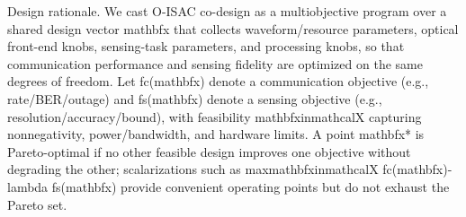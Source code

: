 {}\markdownRendererThematicBreak{}\markdownRendererInterblockSeparator
{}
\markdownRendererSectionEnd 
\markdownRendererSectionEnd \markdownRendererSectionBegin
{}\markdownRendererInterblockSeparator
{}\markdownRendererSectionBegin
{}\markdownRendererInterblockSeparator
{}Design rationale. We cast O-ISAC co-design as a multiobjective program over a shared design vector \markdownRendererDollarSign{}\markdownRendererBackslash{}mathbf\markdownRendererLeftBrace{}x\markdownRendererRightBrace{}\markdownRendererDollarSign{} that collects waveform/resource parameters, optical front-end knobs, sensing-task parameters, and processing knobs, so that communication performance and sensing fidelity are optimized on the same degrees of freedom. Let \markdownRendererDollarSign{}f\markdownRendererUnderscore{}c(\markdownRendererBackslash{}mathbf\markdownRendererLeftBrace{}x\markdownRendererRightBrace{})\markdownRendererDollarSign{} denote a communication objective (e.g., rate/BER/outage) and \markdownRendererDollarSign{}f\markdownRendererUnderscore{}s(\markdownRendererBackslash{}mathbf\markdownRendererLeftBrace{}x\markdownRendererRightBrace{})\markdownRendererDollarSign{} denote a sensing objective (e.g., resolution/accuracy/bound), with feasibility \markdownRendererDollarSign{}\markdownRendererBackslash{}mathbf\markdownRendererLeftBrace{}x\markdownRendererRightBrace{}\markdownRendererBackslash{}in\markdownRendererBackslash{}mathcal\markdownRendererLeftBrace{}X\markdownRendererRightBrace{}\markdownRendererDollarSign{} capturing nonnegativity, power/bandwidth, and hardware limits. A point \markdownRendererDollarSign{}\markdownRendererBackslash{}mathbf\markdownRendererLeftBrace{}x\markdownRendererRightBrace{}\markdownRendererCircumflex{}*\markdownRendererDollarSign{} is Pareto-optimal if no other feasible design improves one objective without degrading the other; scalarizations such as \markdownRendererDollarSign{}\markdownRendererBackslash{}max\markdownRendererUnderscore{}\markdownRendererLeftBrace{}\markdownRendererBackslash{}mathbf\markdownRendererLeftBrace{}x\markdownRendererRightBrace{}\markdownRendererBackslash{}in\markdownRendererBackslash{}mathcal\markdownRendererLeftBrace{}X\markdownRendererRightBrace{}\markdownRendererRightBrace{} f\markdownRendererUnderscore{}c(\markdownRendererBackslash{}mathbf\markdownRendererLeftBrace{}x\markdownRendererRightBrace{})-\markdownRendererBackslash{}lambda f\markdownRendererUnderscore{}s(\markdownRendererBackslash{}mathbf\markdownRendererLeftBrace{}x\markdownRendererRightBrace{})\markdownRendererDollarSign{} provide convenient operating points but do not exhaust the Pareto set.\markdownRendererParagraphSeparator
